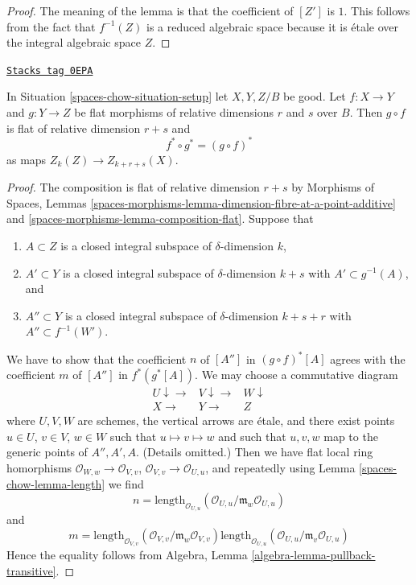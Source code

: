 \begin{proof}
The meaning of the lemma is that the coefficient of $[Z']$ is $1$.
This follows from the fact that $f^{-1}(Z)$ is a reduced algebraic space
because it is \'etale over the integral algebraic space $Z$.
\end{proof}

\begin{lemma}
\label{spaces-chow-lemma-compose-flat-pullback}
\href{https://stacks.math.columbia.edu/tag/0EPA}{\texttt{Stacks tag 0EPA}}

In Situation \ref{spaces-chow-situation-setup} let $X, Y, Z/B$ be good.
Let $f : X \to Y$ and $g : Y \to Z$ be flat morphisms of relative dimensions
$r$ and $s$ over $B$. Then $g \circ f$ is flat of relative dimension
$r + s$ and
$$
f^* \circ g^* = (g \circ f)^*
$$
as maps $Z_k(Z) \to Z_{k + r + s}(X)$.
\end{lemma}

\begin{proof}
The composition is flat of relative dimension $r + s$ by
Morphisms of Spaces, Lemmas
\ref{spaces-morphisms-lemma-dimension-fibre-at-a-point-additive} and
\ref{spaces-morphisms-lemma-composition-flat}.
Suppose that
\begin{enumerate}
\item $A \subset Z$ is a closed integral subspace of $\delta$-dimension $k$,
\item $A' \subset Y$ is a closed integral subspace of $\delta$-dimension
$k + s$ with $A' \subset g^{-1}(A)$, and
\item $A'' \subset Y$ is a closed integral subspace of $\delta$-dimension
$k + s + r$ with $A'' \subset f^{-1}(W')$.
\end{enumerate}
We have to show that the coefficient $n$ of $[A'']$ in $(g \circ f)^*[A]$
agrees with the coefficient $m$ of $[A'']$ in $f^*(g^*[A])$. We may choose
a commutative diagram
$$
\begin{array}{ccc}U \downarrow\longrightarrow & V \downarrow\longrightarrow & W \downarrow \\ X \longrightarrow & Y \longrightarrow & Z\end{array}
$$
where $U, V, W$ are schemes, the vertical arrows are \'etale, and
there exist points $u \in U$, $v \in V$, $w \in W$ such that
$u \mapsto v \mapsto w$ and such that $u, v, w$ map to the generic
points of $A'', A', A$. (Details omitted.)
Then we have flat local ring homorphisms
$\mathcal{O}_{W, w} \to \mathcal{O}_{V, v}$,
$\mathcal{O}_{V, v} \to \mathcal{O}_{U, u}$,
and repeatedly using Lemma \ref{spaces-chow-lemma-length}
we find
$$
n = \text{length}_{\mathcal{O}_{U, u}}(
\mathcal{O}_{U, u}/\mathfrak m_w\mathcal{O}_{U, u})
$$
and
$$
m =
\text{length}_{\mathcal{O}_{V, v}}(
\mathcal{O}_{V, v}/\mathfrak m_w\mathcal{O}_{V, v})
\text{length}_{\mathcal{O}_{U, u}}(
\mathcal{O}_{U, u}/\mathfrak m_v\mathcal{O}_{U, u})
$$
Hence the equality follows from
Algebra, Lemma \ref{algebra-lemma-pullback-transitive}.
\end{proof}

